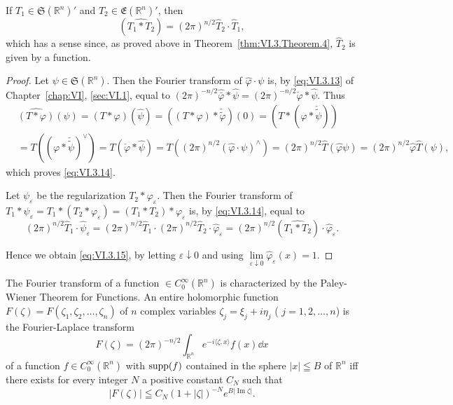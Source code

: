 If $T_{1} \in \mathfrak{S}(\mathbb{R}^{n})'$ and $T_{2} \in \mathfrak{E}(\mathbb{R}^{n})'$, then 
\begin{equation}\label{eq:VI.3.15}
(\widehat {T _{1} * T _{2}}) = (2 \pi) ^{n/2} \hat {T} _{2} \cdot \hat {T} _{1},
\end{equation}
which has a sense since, as proved above in Theorem~\ref{thm:VI.3.Theorem.4}, $\hat{T}_{2}$ is given by a function. 

\begin{proof}
 Let $\psi \in \mathfrak{S}(\mathbb{R}^{n})$. Then the Fourier transform of $\hat{\varphi} \cdot \psi$ is, by \eqref{eq:VI.3.13} of Chapter~\ref{chap:VI}, \ref{sec:VI.1}, equal to $(2\pi)^{-n/2} \hat{\bar{\varphi}} * \hat{\psi} = (2\pi)^{-n/2} \check{\varphi} * \hat{\psi}$. Thus 
\[
\begin{aligned}
&\widehat {(T * \varphi)} (\psi)  = (T * \varphi) (\hat {\psi}) = ((T * \varphi) * \check {\tilde {\varphi}}) (0) = (T * (\varphi * \check {\tilde {\psi}})) \\
&= T ((\varphi * \check {\tilde {\psi}}) ^{\vee}) = T (\check {\varphi} * \hat {\psi}) = T ((2 \pi) ^{n/2} (\hat {\varphi} \cdot \psi) ^{\wedge}) = (2 \pi) ^{n/2} \hat {T} (\hat {\varphi} \psi) = (2 \pi) ^{n/2} \hat {\varphi} \hat {T} (\psi),
\end{aligned}
\]
which proves \eqref{eq:VI.3.14}. 

Let $\psi_{\varepsilon}$ be the regularization $T_{2} * \varphi_{\varepsilon}$. Then the Fourier transform of $T_{1} * \psi_{\varepsilon} = T_{1} * (T_{2} * \varphi_{\varepsilon}) = (T_{1} * T_{2}) * \varphi_{\varepsilon}$ is, by \eqref{eq:VI.3.14}, equal to 
\[
(2 \pi) ^{n/2} \hat {T} _{1} \cdot \hat {\psi} _{\varepsilon} = (2 \pi) ^{n/2} \hat {T} _{1} \cdot (2 \pi) ^{n/2} \hat {T} _{2} \cdot \hat {\varphi} _{\varepsilon} = (2 \pi) ^{n/2} (\widehat {T _{1} * T _{2}}) \cdot \hat {\varphi} _{\varepsilon}.
\]

Hence we obtain \eqref{eq:VI.3.15}, by letting $\varepsilon \downarrow 0$ and using $\lim\limits_{\varepsilon \downarrow 0} \hat{\varphi}_{\varepsilon}(x) = 1$. 
\end{proof}


\label{sec:VI.4}

The Fourier transform of a function $\in C_0^\infty (\mathbb{R}^{n})$ is characterized by the Paley-Wiener Theorem for Functions. An entire holomorphic function $F(\zeta) = F(\zeta_1,\zeta_2,\dots ,\zeta_n)$ of $n$ complex variables $\zeta_j = \xi_j + i\eta_j$ ( $j = 1,2,\ldots ,n$) is the Fourier-Laplace transform 
\begin{equation}\label{eq:VI.4.1}
F (\zeta) = (2 \pi) ^{-n/2} \int_ {\mathbb{R}^{n}} e ^{- i \langle \zeta , x \rangle} f (x) \dd x
\end{equation}
of a function $f \in C_0^\infty(\mathbb{R}^{n})$ with $\operatorname{supp}(f)$ contained in the sphere $|x| \leqq B$ of $\mathbb{R}^{n}$ iff there exists for every integer $N$ a positive constant $C_N$ such that 
\begin{equation}\label{eq:VI.4.2}
\left| F (\zeta) \right| \leqq C _{N} (1 + | \zeta |) ^{-N} e ^{B | \operatorname{Im} \zeta |}.
\end{equation}

